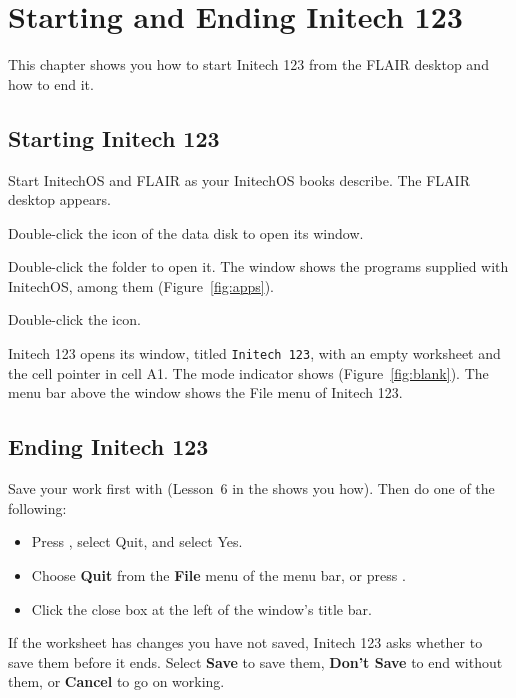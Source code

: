 \chapter{Starting and Ending Initech 123}
\IsThisGoodForTheCompany

This chapter shows you how to start Initech 123 from the FLAIR desktop and
how to end it.

\section{Starting Initech 123}
\begin{Steps123}
\item Start InitechOS and FLAIR as your InitechOS books describe.  The
  FLAIR desktop appears.
\item Double-click the icon of the data disk to open its window.
\item Double-click the  folder to open it.  The window shows the
  programs supplied with InitechOS, among them 
  (Figure~\ref{fig:apps}).
\item Double-click the  icon.
\end{Steps123}

Initech 123 opens its window, titled \texttt{Initech 123}, with an empty
worksheet and the cell pointer in cell A1.  The mode indicator shows
 (Figure~\ref{fig:blank}).  The menu bar above the window shows
the File menu of Initech 123.

\section{Ending Initech 123}
Save your work first with  (Lesson~6 in the
 shows you how).  Then do one of the following:
\begin{itemize}
\item Press , select Quit, and select Yes.
\item Choose \textbf{Quit} from the \textbf{File} menu of the menu bar, or
  press .
\item Click the close box at the left of the window's title bar.
\end{itemize}
If the worksheet has changes you have not saved, Initech 123 asks whether to
save them before it ends.  Select \textbf{Save} to save them,
\textbf{Don't Save} to end without them, or \textbf{Cancel} to go on
working.
